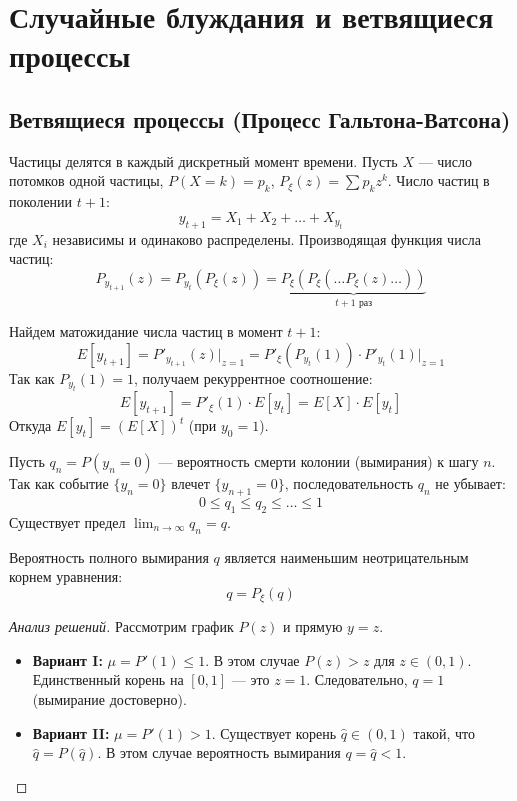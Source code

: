 \section{Случайные блуждания и ветвящиеся процессы}

\subsection{Ветвящиеся процессы (Процесс Гальтона-Ватсона)}

\begin{example}
Частицы делятся в каждый дискретный момент времени.
Пусть $X$ --- число потомков одной частицы, $P(X=k)=p_k$, $P_\xi(z) = \sum p_k z^k$.
Число частиц в поколении $t+1$:
$$ y_{t+1} = X_1 + X_2 + \dots + X_{y_t} $$
где $X_i$ независимы и одинаково распределены.
Производящая функция числа частиц:
$$ P_{y_{t+1}}(z) = P_{y_t}(P_\xi(z)) = \underbrace{P_\xi(P_\xi(\dots P_\xi(z)\dots))}_{t+1 \text{ раз}} $$
\end{example}

\begin{statement}
Найдем матожидание числа частиц в момент $t+1$:
$$ E[y_{t+1}] = P'_{y_{t+1}}(z)\Big|_{z=1} = P'_\xi(P_{y_t}(1)) \cdot P'_{y_t}(1)\Big|_{z=1} $$
Так как $P_{y_t}(1)=1$, получаем рекуррентное соотношение:
$$ E[y_{t+1}] = P'_\xi(1) \cdot E[y_t] = E[X] \cdot E[y_t] $$
Откуда $E[y_t] = (E[X])^t$ (при $y_0=1$).
\end{statement}

\begin{definition}
Пусть $q_n = P(y_n = 0)$ --- вероятность смерти колонии (вымирания) к шагу $n$.
Так как событие $\{y_n=0\}$ влечет $\{y_{n+1}=0\}$, последовательность $q_n$ не убывает:
$$ 0 \le q_1 \le q_2 \le \dots \le 1 $$
Существует предел $\lim_{n \to \infty} q_n = q$.
\end{definition}

\begin{theorem}
Вероятность полного вымирания $q$ является наименьшим неотрицательным корнем уравнения:
$$ q = P_\xi(q) $$
\end{theorem}

\begin{proof}[Анализ решений]
Рассмотрим график $P(z)$ и прямую $y=z$.
\begin{itemize}
    \item \textbf{Вариант I:} $\mu = P'(1) \le 1$.
    В этом случае $P(z) > z$ для $z \in (0, 1)$. Единственный корень на $[0,1]$ --- это $z=1$.
    Следовательно, $q=1$ (вымирание достоверно).
    \item \textbf{Вариант II:} $\mu = P'(1) > 1$.
    Существует корень $\hat{q} \in (0, 1)$ такой, что $\hat{q} = P(\hat{q})$.
    В этом случае вероятность вымирания $q = \hat{q} < 1$.
\end{itemize}
\end{proof}

